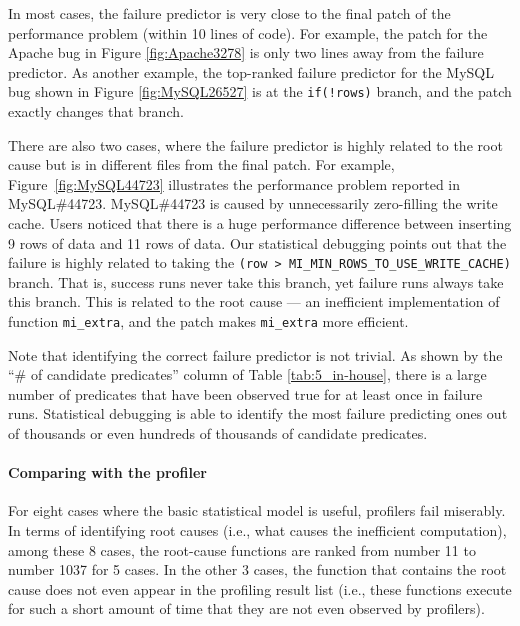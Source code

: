 In most cases, the failure predictor
is very close to the final patch of the performance problem (within 10 lines
of code).
For example, the patch for the Apache bug in Figure 
\ref{fig:Apache3278} is only two lines away from the failure predictor.
As another example, 
the top-ranked failure predictor for the MySQL bug shown in 
Figure \ref{fig:MySQL26527} is at the \lstinline{if(!rows)} branch, and
the patch exactly changes that branch. 




There are also two cases, where the failure predictor is highly related to the
root cause but is in different files from the final patch.
For example, Figure~\ref{fig:MySQL44723} illustrates the performance problem
reported in MySQL\#44723.
MySQL\#44723 is caused by unnecessarily zero-filling the write cache. 
Users noticed that there is a huge performance difference between 
inserting 9 rows of data and 11 rows of data.
Our statistical debugging points out that the failure is highly
related to taking the
\texttt{(row > MI\_MIN\_ROWS\_TO\_USE\_WRITE\_CACHE)} branch.
That is, success runs never take this branch, yet failure runs always
take this branch.
This is related to the root cause --- an inefficient implementation
of function \texttt{mi\_extra}, and the patch makes \texttt{mi\_extra}
more efficient.

Note that identifying the correct failure predictor is not trivial.
As shown by the ``\# of candidate predicates'' column
of Table \ref{tab:5_in-house}, there is a large number of predicates that
have been observed true for at least once in failure runs.
Statistical debugging is able to identify the most failure predicting ones
out of thousands or even hundreds of thousands of candidate predicates.



\paragraph{Comparing with the profiler}
For eight cases where the basic statistical model is useful, profilers fail miserably. 
In terms of identifying root causes (i.e., what causes the inefficient 
computation), among these 8 cases,
the root-cause functions are ranked from number 11 to 
number 1037 for 5 cases. In the other 3 cases, the
function that contains the root cause does not even appear in the profiling 
result list (i.e., these functions execute for such a short amount of time that
they are not even observed by profilers).

